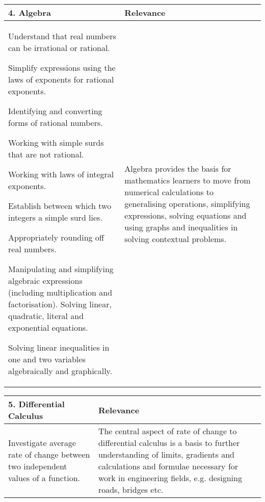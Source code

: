 \begin{table}[H]
\begin{center} 
\begin{tabular}{|p{8.5cm}|p{3.5cm}|} \hline
\textbf{4. Algebra}&\textbf{Relevance}  \\ \hline  

Understand that real numbers can be irrational or rational. \par
Simplify expressions using the laws of exponents for rational exponents.\par
Identifying and converting forms of rational numbers.\par
Working with simple surds that are not rational.\par
Working with laws of integral exponents.\par
Establish between which two integers a simple surd lies.\par
Appropriately rounding off real numbers.\par
Manipulating and simplifying algebraic expressions (including multiplication and factorisation).
Solving linear, quadratic, literal and exponential equations.\par
Solving linear inequalities in one and two variables algebraically and graphically.& Algebra provides the basis for mathematics learners to move from numerical calculations to generalising operations, simplifying expressions, solving equations and using graphs and inequalities in solving contextual problems.
\\ \hline

 \end{tabular}
\end{center}
\end{table}

\begin{table}[H]
 \begin{center} 
\begin{tabular}{|p{8.5cm}|p{3.5cm}|} \hline
\textbf{5. Differential Calculus}& \textbf{Relevance}\\ \hline  

Investigate average rate of change between two independent values of a function.& The central aspect of rate of change to differential calculus is a basis to further understanding of limits, gradients and calculations and formulae necessary for work in engineering fields, e.g. designing roads, bridges etc. 
\\ \hline

 \end{tabular}
\end{center}
\end{table}

